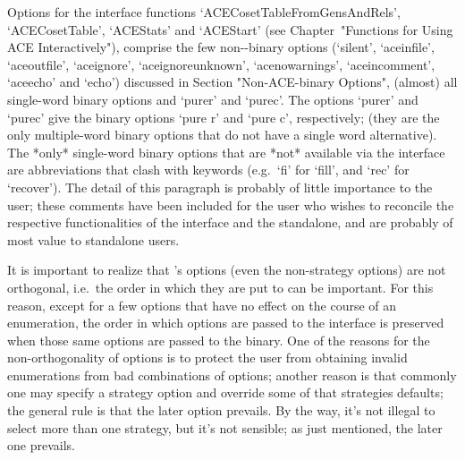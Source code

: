 Options      for      the       {\ACE}       interface       functions
`ACECosetTableFromGensAndRels',   `ACECosetTable',   `ACEStats'    and
`ACEStart' (see  Chapter~"Functions  for  Using  ACE  Interactively"),
comprise the few  non-{\ACE}-binary  options  (`silent',  `aceinfile',
`aceoutfile',   `aceignore',   `aceignoreunknown',    `acenowarnings',
`aceincomment',     `aceecho'     and     `echo')     discussed     in
Section "Non-ACE-binary  Options",  (almost)  all  single-word  {\ACE}
binary options and  `purer'  and  `purec'.  The  options  `purer'  and
`purec' give  the  {\ACE}  binary  options  `pure  r'  and  `pure  c',
respectively; (they are the only multiple-word {\ACE}  binary  options
that do not have a single word alternative).  The  *only*  single-word
{\ACE}  binary  options  that  are  *not*  available  via  the  {\ACE}
interface are abbreviations that clash with {\GAP} keywords (e.g.~`fi'
for `fill', and `rec' for `recover'). The detail of this paragraph  is
probably of little importance to the {\GAP} user; these comments  have
been included for the user who  wishes  to  reconcile  the  respective
functionalities of the {\ACE} interface and the {\ACE} standalone, and
are probably of most value to standalone users.


It  is  important  to  realize  that  {\ACE}'s   options   (even   the
non-strategy options) are not orthogonal, i.e.\  the  order  in  which
they are put to {\ACE} can be important. For this reason, except for a
few options that have no effect on the course of an  enumeration,  the
order in which options are passed to the {\ACE} interface is preserved
when those same options are passed to the {\ACE} binary.  One  of  the
reasons for the non-orthogonality of options is to  protect  the  user
from obtaining invalid enumerations from bad combinations of  options;
another reason is that commonly one may specify a strategy option  and
override some of that strategies defaults; the general  rule  is  that
the later option prevails. By the way, it's not illegal to select more
than one strategy, but it's not sensible; as just mentioned, the later
one prevails.


